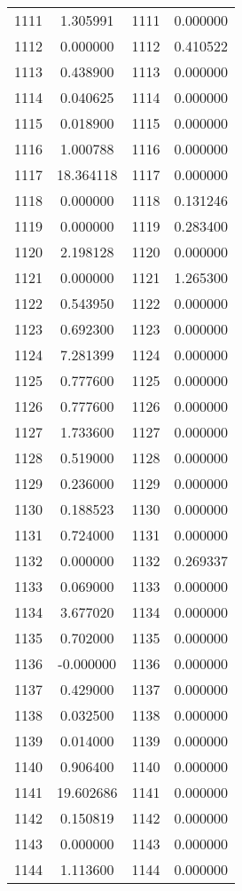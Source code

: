 \documentclass[12pt]{article}
\begin{document}
\begin{longtable}{@{}cccc@{}}
1111 & 1.305991 & 1111 & 0.000000 \\
1112 & 0.000000 & 1112 & 0.410522 \\
1113 & 0.438900 & 1113 & 0.000000 \\
1114 & 0.040625 & 1114 & 0.000000 \\
1115 & 0.018900 & 1115 & 0.000000 \\
1116 & 1.000788 & 1116 & 0.000000 \\
1117 & 18.364118 & 1117 & 0.000000 \\
1118 & 0.000000 & 1118 & 0.131246 \\
1119 & 0.000000 & 1119 & 0.283400 \\
1120 & 2.198128 & 1120 & 0.000000 \\
1121 & 0.000000 & 1121 & 1.265300 \\
1122 & 0.543950 & 1122 & 0.000000 \\
1123 & 0.692300 & 1123 & 0.000000 \\
1124 & 7.281399 & 1124 & 0.000000 \\
1125 & 0.777600 & 1125 & 0.000000 \\
1126 & 0.777600 & 1126 & 0.000000 \\
1127 & 1.733600 & 1127 & 0.000000 \\
1128 & 0.519000 & 1128 & 0.000000 \\
1129 & 0.236000 & 1129 & 0.000000 \\
1130 & 0.188523 & 1130 & 0.000000 \\
1131 & 0.724000 & 1131 & 0.000000 \\
1132 & 0.000000 & 1132 & 0.269337 \\
1133 & 0.069000 & 1133 & 0.000000 \\
1134 & 3.677020 & 1134 & 0.000000 \\
1135 & 0.702000 & 1135 & 0.000000 \\
1136 & -0.000000 & 1136 & 0.000000 \\
1137 & 0.429000 & 1137 & 0.000000 \\
1138 & 0.032500 & 1138 & 0.000000 \\
1139 & 0.014000 & 1139 & 0.000000 \\
1140 & 0.906400 & 1140 & 0.000000 \\
1141 & 19.602686 & 1141 & 0.000000 \\
1142 & 0.150819 & 1142 & 0.000000 \\
1143 & 0.000000 & 1143 & 0.000000 \\
1144 & 1.113600 & 1144 & 0.000000 \\

\end{longtable}
\end{document}
